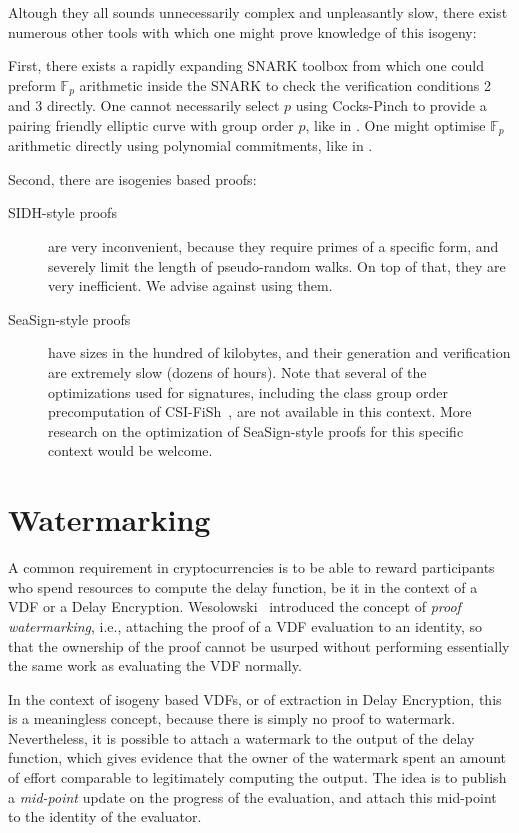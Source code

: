 \documentclass{llncs}
\newcommand{\F}{\mathbb{F}}
\begin{document}
Altough they all sounds unnecessarily complex and unpleasantly slow,
there exist numerous other tools with which one might prove knowledge
of this isogeny:
 
First, there exists a rapidly expanding SNARK toolbox from which
one could preform $\F_p$ arithmetic inside the SNARK to check the
verification conditions 2 and 3 directly.  
One cannot necessarily select $p$ using Cocks-Pinch to provide a
pairing friendly elliptic curve with group order $p$, like in \cite{ZEXE}. %
One might optimise $\F_p$ arithmetic directly using polynomial
commitments, like in \cite{plookup}. %

Second, there are isogenies based proofs:
\begin{description}
\item[SIDH-style proofs~\cite{defeo+jao+plut12}] %
  are very inconvenient, because they require primes of a specific
  form, and severely limit the length of pseudo-random walks. %
  On top of that, they are very inefficient. %
  We advise against using them.
\item[SeaSign-style proofs~\cite{10.1007/978-3-030-17659-4_26}] %
  have sizes in the hundred of kilobytes, and their generation and
  verification are extremely slow (dozens of hours). %
  Note that several of the optimizations used for signatures,
  including the class group order precomputation of
  CSI-FiSh~\cite{10.1007/978-3-030-34578-5_9}, are not available in
  this context. %
  More research on the optimization of SeaSign-style proofs for this
  specific context would be welcome.
\end{description}


\section{Watermarking}
\label{sec:watermarking}

A common requirement in cryptocurrencies is to be able to reward
participants who spend resources to compute the delay function, be it
in the context of a VDF or a Delay Encryption. %
Wesolowski~\cite{Wesolowski} introduced the concept of \emph{proof
  watermarking}, i.e., attaching the proof of a VDF evaluation to an
identity, so that the ownership of the proof cannot be usurped without
performing essentially the same work as evaluating the VDF normally.

In the context of isogeny based VDFs, or of extraction in Delay
Encryption, this is a meaningless concept, because there is simply no
proof to watermark. %
Nevertheless, it is possible to attach a watermark to the output of
the delay function, which gives evidence that the owner of the
watermark spent an amount of effort comparable to legitimately
computing the output. %
The idea is to publish a \emph{mid-point} update on the progress of
the evaluation, and attach this mid-point to the identity of the
evaluator.
\end{document}
